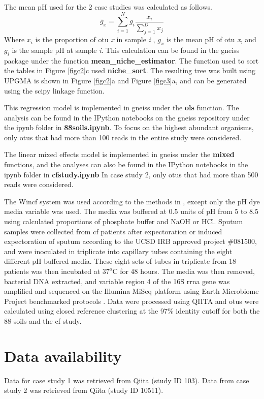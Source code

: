  The mean pH used for the 2 case studies was calculated as follows.
 \begin{equation}
        \overline{g}_{x}=\sum_{i=1}^{N}g_{i}\frac{x_{i}}{\sum_{j=1}^{D}x_{j}}
 \end{equation}
 Where $x_{i}$ is the proportion of \gls{otu} \textit{x} in sample \textit{i} , $g_{x}$ is the mean pH of \gls{otu} \textit{x}, and $g_{i}$ is the sample pH at sample \textit{i}. This calculation can be found in the gneiss package under the function \textbf{mean\_niche\_estimator}. The function used to sort the tables in Figure \ref{figc2}c used \textbf{niche\_sort}. The resulting tree was built using UPGMA \cite{upgma} is shown in Figure \ref{figc2}a and Figure \ref{figc3}a, and can be generated using the scipy linkage function.\par
 This regression model is implemented in gneiss under the \textbf{ols} function.  The analysis can be found in the IPython notebooks on the gneiss repository under the ipynb folder in \textbf{88soils.ipynb}. To focus on the highest abundant organisms, only \gls{otu}s that had more than 100 reads in the entire study were considered.\par
 The linear mixed effects model is implemented in gneiss under the \textbf{mixed} functions, and the analyses can also be found in the IPython notebooks in the ipynb folder in \textbf{cfstudy.ipynb} In case study 2, only \gls{otu}s that had more than 500 reads were considered.   \par
 The Win\gls{cf} system was used according to the methods in \cite{wincf}, except only the pH dye media variable was used. The media was buffered at 0.5 units of pH from 5 to 8.5 using calculated proportions of phosphate buffer and NaOH or HCl. Sputum samples were collected from \gls{cf} patients after expectoration or induced expectoration of sputum according to the UCSD IRB approved project \#081500, and were inoculated in triplicate into capillary tubes containing the eight different pH buffered media. These eight sets of tubes in triplicate from 18 patients was then incubated at $37^{o}$C for 48 hours. The media was then removed, bacterial DNA extracted, and variable region 4 of the 16S \gls{rrna} gene was amplified and sequenced on the Illumina MiSeq platform using Earth Microbiome Project benchmarked protocols \cite{illumina_microbes, global_patterns}.  Data were processed using QIITA and \gls{otu}s were calculated using closed reference clustering at the 97\% identity cutoff for both the 88 soils and the \gls{cf} study.
\section{ Data availability}
Data for case study 1 was retrieved from Qiita (study ID 103). Data from case study 2 was retrieved from Qiita (study ID 10511).

